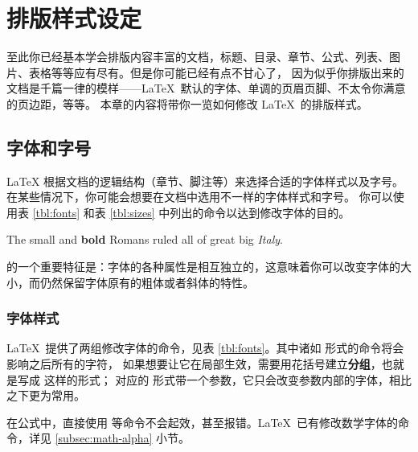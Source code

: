\chapter{排版样式设定}\label{chap:styles}

\begin{intro}
至此你已经基本学会排版内容丰富的文档，标题、目录、章节、公式、列表、图片、表格等等应有尽有。但是你可能已经有点不甘心了，
因为似乎你排版出来的文档是千篇一律的模样——\LaTeX\ 默认的字体、单调的页眉页脚、不太令你满意的页边距，等等。
本章的内容将带你一览如何修改 \LaTeX\ 的排版样式。
\end{intro}

\section{字体和字号}\label{sec:font}

\LaTeX{} 根据文档的逻辑结构（章节、脚注等）来选择合适的字体样式以及字号。
在某些情况下，你可能会想要在文档中选用不一样的字体样式和字号。
你可以使用表 \ref{tbl:fonts} 和表 \ref{tbl:sizes} 中列出的命令以达到修改字体的目的。
\begin{example}
{\small The small and
\textbf{bold} Romans ruled}
{\Large all of great big
{\itshape Italy}.}
\end{example}

\LaTeXe 的一个重要特征是：字体的各种属性是相互独立的，这意味着你可以改变字体的大小，而仍然保留字体原有的粗体或者斜体的特性。

\subsection{字体样式}\label{subsec:fontshape}

\LaTeX\ 提供了两组修改字体的命令，见表 \ref{tbl:fonts}。其中诸如  形式的命令将会影响之后所有的字符，
如果想要让它在局部生效，需要用花括号建立\textbf{分组}，也就是写成  这样的形式；
对应的  形式带一个参数，它只会改变参数内部的字体，相比之下更为常用。

在公式中，直接使用  等命令不会起效，甚至报错。\LaTeX\ 已有修改数学字体的命令，详见 \ref{subsec:math-alpha} 小节。


